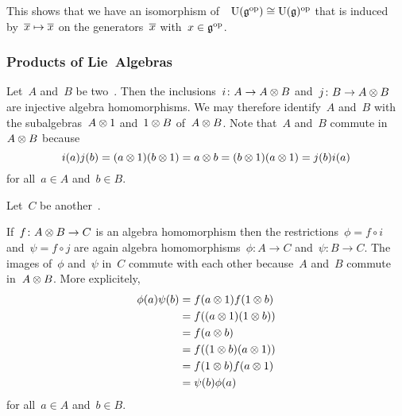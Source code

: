\begin{example}
  This shows that we have an isomorphism of~{\algebras{$\kf$}}~$\operatorname{U}(\mathfrak{g}^{\mathrm{op}}) \cong \operatorname{U}(\mathfrak{g})^{\mathrm{op}}$ that is induced by~$\overline{x} \mapsto \overline{x}$ on the generators~$\overline{x}$ with~$x \in \mathfrak{g}^{\mathrm{op}}$.
\end{example}





\subsubsection{Products of Lie~Algebras}


\begin{recall}
  \label{homomorphism out of a tensor product}
  Let~$A$ and~$B$ be two~{\algebras{$\kf$}}.
  Then the inclusions~$i \colon A \to A \otimes B$ and~$j \colon B \to A \otimes B$ are injective algebra homomorphisms.
  We may therefore identify~$A$ and~$B$ with the subalgebras~$A \otimes 1$ and~$1 \otimes B$ of~$A \otimes B$.
  Note that~$A$ and~$B$ commute in~$A \otimes B$ because
  \[
    i(a) j(b)
    =
    (a \otimes 1) (b \otimes 1)
    =
    a \otimes b
    =
    (b \otimes 1) (a \otimes 1)
    =
    j(b) i(a)
  \]
  for all~$a \in A$ and~$b \in B$.
  
  Let~$C$ be another~{\algebra{$\kf$}}.
  
  If~$f \colon A \otimes B \to C$ is an algebra homomorphism then the restrictions~$\phi = f \circ i$ and~$\psi = f \circ j$ are again algebra homomorphisms~$\phi \colon A \to C$ and~$\psi \colon B \to C$.
  The images of~$\phi$ and~$\psi$ in~$C$ commute with each other because~$A$ and~$B$ commute in~$A \otimes B$.
  More explicitely,
  \begin{align*}
    \phi(a) \psi(b)
    &=
    f(a \otimes 1) f(1 \otimes b)
    \\
    &=
    f((a \otimes 1) (1 \otimes b))
    \\
    &=
    f(a \otimes b)
    \\
    &=
    f((1 \otimes b) (a \otimes 1))
    \\
    &=
    f(1 \otimes b) f(a \otimes 1)
    \\
    &=
    \psi(b) \phi(a)
  \end{align*}
  for all~$a \in A$ and~$b \in B$.
  

\end{recall}

